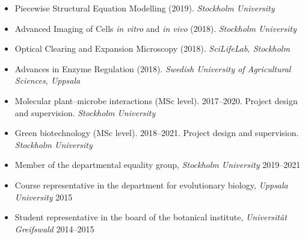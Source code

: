\documentclass[11pt]{article}
\begin{document}
\vspace{-0.175cm}
\begin{itemize}[label={},itemindent=-9pt,leftmargin=24pt]
	\itemsep-0.1cm
	\item Piecewise Structural Equation Modelling (2019). \textit{Stockholm University}
	\item Advanced Imaging of Cells \textit{in vitro} and \textit{in vivo} (2018). \textit{Stockholm University} 
	\item Optical Clearing and Expansion Microscopy (2018). \textit{SciLifeLab, Stockholm} 	
	\item Advances in Enzyme Regulation (2018). \textit{Swedish University of Agricultural Sciences, Uppsala} 
\end{itemize}
\vspace{0.3cm}

\vspace{-0.175cm}
\begin{itemize}[label={},itemindent=-9pt,leftmargin=24pt]
	\itemsep-0.1cm
	\item Molecular plant--microbe interactions (MSc level). 2017--2020. Project design and supervision. \textit{Stockholm University} 	
	\item Green biotechnology (MSc level). 2018--2021. Project design and supervision. \textit{Stockholm University} 
\end{itemize}
\vspace{0.3cm}

\vspace{-0.175cm}
\begin{itemize}[label={},itemindent=-9pt,leftmargin=24pt]
	\itemsep-0.1cm
	\item Member of the departmental equality group, \textit{Stockholm University}  \hfill 2019--2021
	\item Course representative in the department for evolutionary biology, \textit{Uppsala University} \hfill 2015
	\item Student representative in the board of the botanical institute, \textit{Universität Greifswald} \hfill 2014--2015
\end{itemize}
\end{document}
